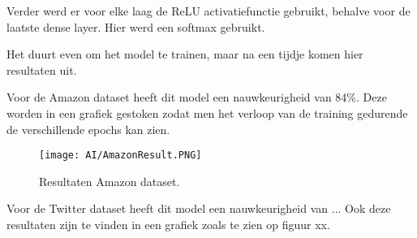 Verder werd er voor elke laag de ReLU activatiefunctie gebruikt, behalve voor de laatste dense layer. Hier werd een softmax gebruikt.  

Het duurt even om het model te trainen, maar na een tijdje komen hier resultaten uit. 

Voor de Amazon dataset heeft dit model een nauwkeurigheid van 84\%. Deze worden in een grafiek gestoken zodat men het verloop van de training gedurende de verschillende epochs kan zien. 

\begin{figure}[!htbp]
    \texttt{[image: AI/AmazonResult.PNG]}
    \caption{\label{amazonresult}Resultaten Amazon dataset.}
\end{figure}
\FloatBarrier

Voor de Twitter dataset heeft dit model een nauwkeurigheid van ...
Ook deze resultaten zijn te vinden in een grafiek zoals te zien op figuur xx. 


